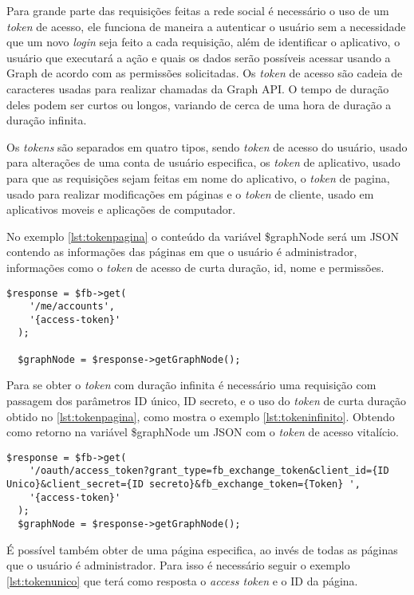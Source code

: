 Para grande parte das requisições feitas a rede social é necessário o uso de um \textit{token} de acesso, ele funciona de maneira a autenticar o usuário sem a necessidade que um novo \textit{login} seja feito a cada requisição, além de identificar o aplicativo, o usuário que executará a ação e quais os dados serão possíveis acessar usando a Graph de acordo com as permissões solicitadas. Os \textit{token} de acesso são cadeia de caracteres usadas para realizar chamadas da Graph API. O tempo de duração deles podem ser curtos ou longos, variando de cerca de uma hora de duração a duração infinita.

Os \textit{tokens} são separados em quatro tipos, sendo \textit{token} de acesso do usuário, usado para alterações de uma conta de usuário especifica, os  \textit{token} de aplicativo, usado para que as requisições sejam feitas em nome do aplicativo, o \textit{token} de pagina, usado para realizar modificações em páginas e o \textit{token} de cliente, usado em aplicativos moveis e aplicações de computador.

No exemplo \ref{lst:tokenpagina} o conteúdo da variável \$graphNode será um JSON contendo as informações das páginas em que o usuário é administrador, informações como o \textit{token} de acesso de curta duração, id, nome e permissões. 

\begin{lstlisting}[caption={Obtendo Token de acesso a página},label={lst:tokenpagina}]
  $response = $fb->get(
    '/me/accounts',
    '{access-token}'
  );
  
  $graphNode = $response->getGraphNode();
\end{lstlisting}

Para se obter o \textit{token} com duração infinita é necessário uma requisição com passagem dos parâmetros ID único, ID secreto, e o uso do \textit{token} de curta duração obtido no \ref{lst:tokenpagina}, como mostra o exemplo \ref{lst:tokeninfinito}. Obtendo como retorno na variável \$graphNode um JSON com o \textit{token} de acesso vitalício.

\begin{lstlisting}[caption={Obtendo Token Infinito},label={lst:tokeninfinito}]
  $response = $fb->get(
    '/oauth/access_token?grant_type=fb_exchange_token&client_id={ID Unico}&client_secret={ID secreto}&fb_exchange_token={Token} ',
    '{access-token}'
  );
  $graphNode = $response->getGraphNode();
\end{lstlisting}

É possível também obter de uma página especifica, ao invés de todas as páginas que o usuário é administrador. Para isso é necessário seguir o exemplo \ref{lst:tokenunico} que terá como resposta o \textit{access token} e o ID da página.


